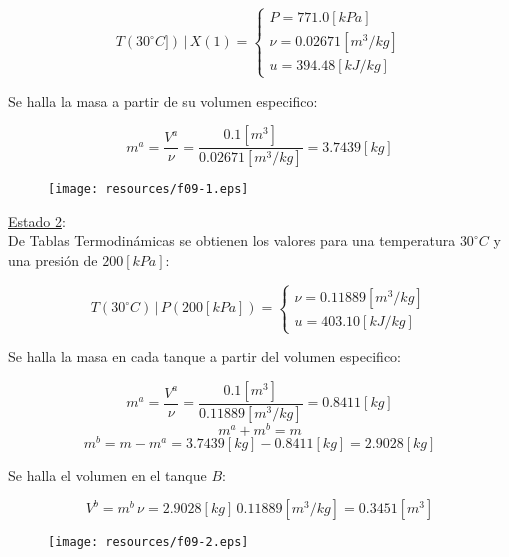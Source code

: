\documentclass[letter,11pt]{article}
\begin{document}
\begin{enumerate}
\begin{equation*}
    T(30^\circ C])\,|\,X(1) = \begin{cases}
        P = 771.0[kPa] \\
        \nu = 0.02671[m^3/kg] \\
        u = 394.48[kJ/kg]
    \end{cases}
\end{equation*}

Se halla la masa a partir de su volumen especifico:

\begin{equation*}
    m^a = \frac{V^a}{\nu} = \frac{0.1[m^3]}{0.02671[m^3/kg]}
      = 3.7439[kg]
\end{equation*}

\begin{figure}[H]
\centering
\texttt{[image: resources/f09-1.eps]}
\end{figure}

\underline{Estado 2}: \\
De Tablas Termodinámicas se obtienen los valores para una temperatura
$30^\circ C$ y una presión de $200[kPa]$:

\begin{equation*}
    T(30^\circ C)\,|\,P(200[kPa]) = \begin{cases}
        \nu = 0.11889[m^3/kg] \\
        u = 403.10[kJ/kg]
    \end{cases}
\end{equation*}

Se halla la masa en cada tanque a partir del volumen especifico:

\begin{equation*}
    m^a = \frac{V^a}{\nu} = \frac{0.1[m^3]}{0.11889[m^3/kg]}
      = 0.8411[kg]
\end{equation*}
\begin{equation*}
    m^a + m^b = m
\end{equation*}
\begin{equation*}
    m^b = m - m^a = 3.7439[kg] - 0.8411[kg] = 2.9028[kg]
\end{equation*}

Se halla el volumen en el tanque $B$:

\begin{equation*}
    V^b = m^b\,\nu = 2.9028[kg]\,0.11889[m^3/kg] = 0.3451[m^3]
\end{equation*}

\begin{figure}[H]
\centering
\texttt{[image: resources/f09-2.eps]}
\end{figure}


\end{enumerate}
\end{document}
